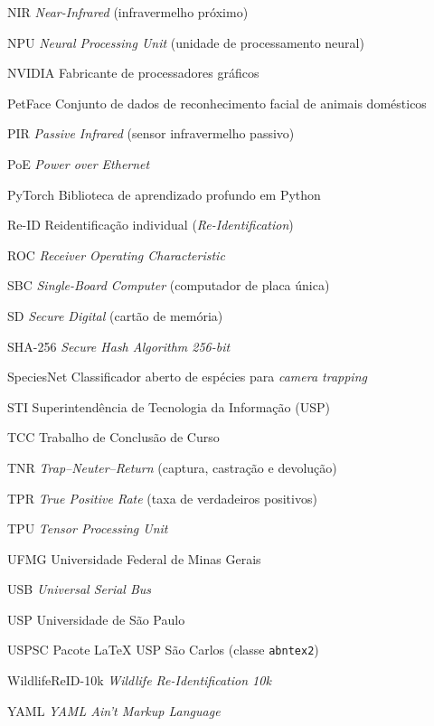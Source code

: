\begin{siglas}
  \item[NIR] \textit{Near-Infrared} (infravermelho próximo)
  \item[NPU] \textit{Neural Processing Unit} (unidade de processamento neural)
  \item[NVIDIA] Fabricante de processadores gráficos
  \item[PetFace] Conjunto de dados de reconhecimento facial de animais domésticos
  \item[PIR] \textit{Passive Infrared} (sensor infravermelho passivo)
  \item[PoE] \textit{Power over Ethernet}
  \item[PyTorch] Biblioteca de aprendizado profundo em Python
  \item[Re-ID] Reidentificação individual (\textit{Re-Identification})
  \item[ROC] \textit{Receiver Operating Characteristic}
  \item[SBC] \textit{Single-Board Computer} (computador de placa única)
  \item[SD] \textit{Secure Digital} (cartão de memória)
  \item[SHA-256] \textit{Secure Hash Algorithm 256-bit}
  \item[SpeciesNet] Classificador aberto de espécies para \textit{camera trapping}
  \item[STI] Superintendência de Tecnologia da Informação (USP)
  \item[TCC] Trabalho de Conclusão de Curso
  \item[TNR] \textit{Trap--Neuter--Return} (captura, castração e devolução)
  \item[TPR] \textit{True Positive Rate} (taxa de verdadeiros positivos)
  \item[TPU] \textit{Tensor Processing Unit}
  \item[UFMG] Universidade Federal de Minas Gerais
  \item[USB] \textit{Universal Serial Bus}
  \item[USP] Universidade de São Paulo
  \item[USPSC] Pacote LaTeX USP São Carlos (classe \texttt{abntex2})
  \item[WildlifeReID-10k] \textit{Wildlife Re-Identification 10k}
  \item[YAML] \textit{YAML Ain't Markup Language}
\end{siglas}
\cleardoublepage

